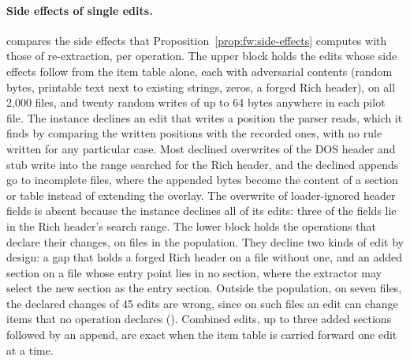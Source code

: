 \paragraph{Side effects of single edits.}  compares the side effects that
Proposition~\ref{prop:fw:side-effects} computes with those of re-extraction, per operation. The upper block holds the
edits whose side effects follow from the item table alone, each with adversarial contents (random bytes, printable text
next to existing strings, zeros, a forged Rich header), on all 2,000 files, and twenty random writes of up to 64 bytes
anywhere in each pilot file. The instance declines an edit that writes a position the parser reads, which it finds by
comparing the written positions with the recorded ones, with no rule written for any particular case. Most declined
overwrites of the DOS header and stub write into the range searched for the Rich header, and the declined appends go
to incomplete files, where the appended bytes become the content of a section or table instead of extending the
overlay. The overwrite of loader-ignored header fields is absent because the instance
declines all of its edits: three of the fields lie in the Rich header's search range. The lower block holds the
operations that declare their changes, on files in the population. They decline two kinds of edit by design: a gap
that holds a forged Rich header on a file without one, and an added section on a file whose entry point lies in no
section, where the extractor may select the new section as the entry section. Outside the population, on seven
files, the declared changes of 45 edits are wrong, since on such files an edit can change items that no operation
declares (). Combined edits, up to three added sections
followed by an append, are exact when the item table is carried forward one edit at a time.


